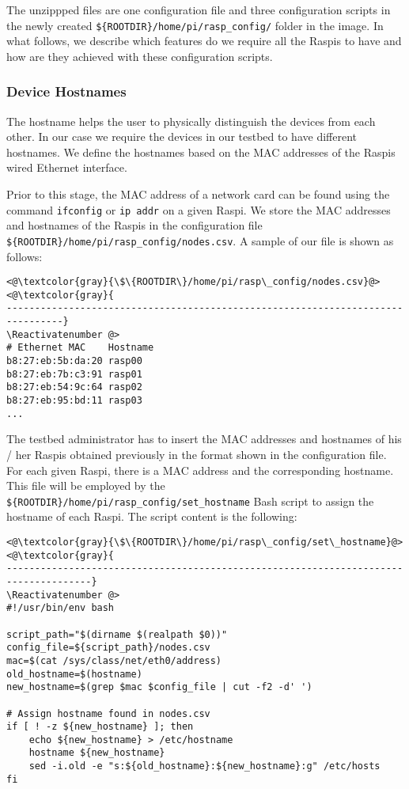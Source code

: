 The unzippped files are one configuration file and three configuration
scripts in the newly created \texttt{\$\{ROOTDIR\}/home/pi/rasp\_config/}
folder in the image. In what follows, we describe which features do we
require all the \ac{Raspi}s to have and how are they achieved with
these configuration scripts.

\subsubsection{Device Hostnames}
The hostname helps the user to physically distinguish the
devices from each other. In our case we require the devices in our
testbed to have different hostnames. We define the hostnames based
on the \ac{MAC} addresses of the \ac{Raspi}s wired Ethernet interface.

Prior to this stage, the \ac{MAC} address of a network card can be found
using the command \texttt{ifconfig} or \texttt{ip addr} on a given
\ac{Raspi}. We store the \ac{MAC} addresses and hostnames of the
\ac{Raspi}s in the configuration file
\texttt{\$\{ROOTDIR\}/home/pi/rasp\_config/nodes.csv}. A sample of our file
is shown as follows:

\Suppressnumber\begin{lstlisting}[]
<@\textcolor{gray}{\$\{ROOTDIR\}/home/pi/rasp\_config/nodes.csv}@>
<@\textcolor{gray}{
--------------------------------------------------------------------------------}
\Reactivatenumber @>
# Ethernet MAC    Hostname
b8:27:eb:5b:da:20 rasp00
b8:27:eb:7b:c3:91 rasp01
b8:27:eb:54:9c:64 rasp02
b8:27:eb:95:bd:11 rasp03
...
\end{lstlisting}
\FloatBarrier
\vspace{-5mm}

The testbed administrator has to insert the \ac{MAC} addresses and hostnames
of his / her \ac{Raspi}s obtained previously in the format shown in the
configuration file. For each given \ac{Raspi}, there is a \ac{MAC} address and
the corresponding hostname. This file will be employed by the
\texttt{\$\{ROOTDIR\}/home/pi/rasp\_config/set\_hostname} \ac{Bash} script to
assign the hostname of each \ac{Raspi}. The script content is the following:

\Suppressnumber\begin{lstlisting}[]
<@\textcolor{gray}{\$\{ROOTDIR\}/home/pi/rasp\_config/set\_hostname}@>
<@\textcolor{gray}{
-------------------------------------------------------------------------------------}
\Reactivatenumber @>
#!/usr/bin/env bash

script_path="$(dirname $(realpath $0))"
config_file=${script_path}/nodes.csv
mac=$(cat /sys/class/net/eth0/address)
old_hostname=$(hostname)
new_hostname=$(grep $mac $config_file | cut -f2 -d' ')

# Assign hostname found in nodes.csv
if [ ! -z ${new_hostname} ]; then
    echo ${new_hostname} > /etc/hostname
    hostname ${new_hostname}
    sed -i.old -e "s:${old_hostname}:${new_hostname}:g" /etc/hosts
fi
\end{lstlisting}
\FloatBarrier
\vspace{-5mm}

